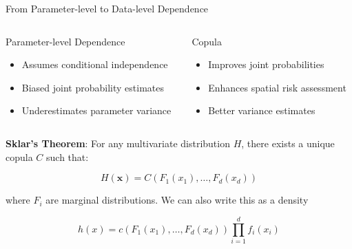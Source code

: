 \documentclass[
  ignorenonframetext,
]{beamer}
\providecommand{\tightlist}{%
  \setlength{\itemsep}{0pt}\setlength{\parskip}{0pt}}\usepackage{longtable,booktabs,array}
\begin{document}
\begin{frame}{From Parameter-level to Data-level Dependence}
\label{from-parameter-level-to-data-level-dependence}
\begin{columns}[T]
\begin{column}{0.5\textwidth}
\begin{block}{Parameter-level Dependence}
\label{parameter-level-dependence}
\begin{itemize}
\tightlist
\item
  Assumes conditional independence
\item
  Biased joint probability estimates
\item
  Underestimates parameter variance
\end{itemize}
\end{block}
\end{column}

\begin{column}{0.5\textwidth}
\begin{block}{Copula}
\label{copula}
\begin{itemize}
\tightlist
\item
  Improves joint probabilities
\item
  Enhances spatial risk assessment
\item
  Better variance estimates
\end{itemize}
\end{block}
\end{column}
\end{columns}

\textbf{Sklar's Theorem}: For any multivariate distribution \(H\), there
exists a unique copula \(C\) such that:

\[
H(\mathbf x) = C(F_1(x_1), \dots, F_d(x_d))
\]

where \(F_i\) are marginal distributions. We can also write this as a
density

\[
h(x) = c(F_1(x_1), \dots, F_d(x_d)) \prod_{i=1}^d f_i(x_i)
\]
\end{frame}
\end{document}
